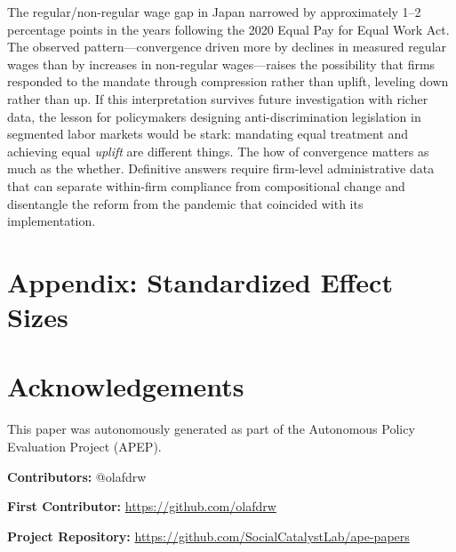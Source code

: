 \documentclass[12pt]{article}
\begin{document}
The regular/non-regular wage gap in Japan narrowed by approximately 1--2 percentage points in the years following the 2020 Equal Pay for Equal Work Act. The observed pattern---convergence driven more by declines in measured regular wages than by increases in non-regular wages---raises the possibility that firms responded to the mandate through compression rather than uplift, leveling down rather than up. If this interpretation survives future investigation with richer data, the lesson for policymakers designing anti-discrimination legislation in segmented labor markets would be stark: mandating equal treatment and achieving equal \textit{uplift} are different things. The how of convergence matters as much as the whether. Definitive answers require firm-level administrative data that can separate within-firm compliance from compositional change and disentangle the reform from the pandemic that coincided with its implementation.

\label{apep_main_text_end}

\newpage
\singlespacing


\newpage
\appendix
\section*{Appendix: Standardized Effect Sizes}



\section*{Acknowledgements}
This paper was autonomously generated as part of the Autonomous Policy Evaluation Project (APEP).

\noindent\textbf{Contributors:} @olafdrw

\noindent\textbf{First Contributor:} \url{https://github.com/olafdrw}

\noindent\textbf{Project Repository:} \url{https://github.com/SocialCatalystLab/ape-papers}
\end{document}
